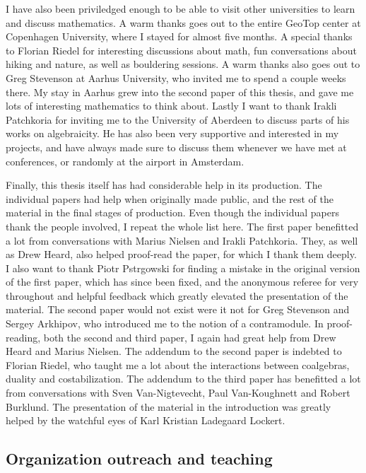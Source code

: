 I have also been priviledged enough to be able to visit other universities to learn and discuss mathematics. A warm thanks goes out to the entire GeoTop center at Copenhagen University, where I stayed for almost five months. A special thanks to Florian Riedel for interesting discussions about math, fun conversations about hiking and nature, as well as bouldering sessions. A warm thanks also goes out to Greg Stevenson at Aarhus University, who invited me to spend a couple weeks there. My stay in Aarhus grew into the second paper of this thesis, and gave me lots of interesting mathematics to think about. Lastly I want to thank Irakli Patchkoria for inviting me to the University of Aberdeen to discuss parts of his works on algebraicity. He has also been very supportive and interested in my projects, and have always made sure to discuss them whenever we have met at conferences, or randomly at the airport in Amsterdam. 

Finally, this thesis itself has had considerable help in its production. The individual papers had help when originally made public, and the rest of the material in the final stages of production. Even though the individual papers thank the people involved, I repeat the whole list here. The first paper benefitted a lot from conversations with Marius Nielsen and Irakli Patchkoria. They, as well as Drew Heard, also helped proof-read the paper, for which I thank them deeply. I also want to thank Piotr Pstr\a{}gowski for finding a mistake in the original version of the first paper, which has since been fixed, and the anonymous referee for very throughout and helpful feedback which greatly elevated the presentation of the material. The second paper would not exist were it not for Greg Stevenson and Sergey Arkhipov, who introduced me to the notion of a contramodule. In proof-reading, both the second and third paper, I again had great help from Drew Heard and Marius Nielsen. The addendum to the second paper is indebted to Florian Riedel, who taught me a lot about the interactions between coalgebras, duality and costabilization. The addendum to the third paper has benefitted a lot from conversations with Sven Van-Nigtevecht, Paul Van-Koughnett and Robert Burklund. The presentation of the material in the introduction was greatly helped by the watchful eyes of Karl Kristian Ladegaard Lockert. 


\subsection*{Organization outreach and teaching}

